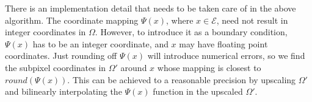 There is an implementation detail that needs to be taken care of in the above algorithm. The coordinate mapping $\Psi(x)$, where $x\in \mathcal{E} $, need not result in integer coordinates in $\Omega$. However, to introduce it as a boundary condition, $\Psi(x)$ has to be an integer coordinate, and $x$ may have floating point coordinates. Just rounding off $\Psi(x)$ will introduce numerical errors, so we find the subpixel coordinates in $\Omega'$ around $x$ whose mapping is closest to $round(\Psi(x))$. This can be achieved to a reasonable precision by upscaling $\Omega'$ and bilinearly interpolating the $\Psi(x)$ function in the upscaled $\Omega'$.

